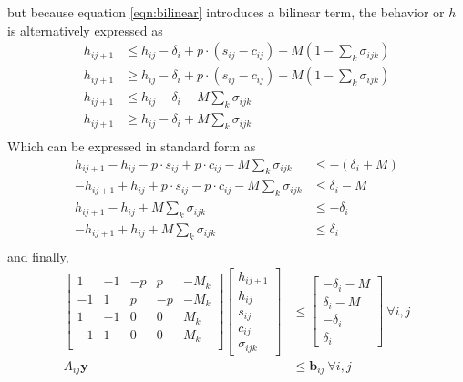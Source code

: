 but because equation \ref{eqn:bilinear} introduces a bilinear term, the behavior or $h$ is alternatively expressed as
\begin{equation} \begin{aligned}
	h_{ij+1} & \le h_{ij} - \delta_i + p\cdot(s_{ij} - c_{ij}) - M(1 - \sum_k\sigma_{ijk})\\
	h_{ij+1} & \ge h_{ij} - \delta_i + p\cdot(s_{ij} - c_{ij}) + M(1 - \sum_k\sigma_{ijk})\\
	h_{ij+1} & \le h_{ij} - \delta_i - M\sum_k\sigma_{ijk}\\
	h_{ij+1} & \ge h_{ij} - \delta_i + M\sum_k\sigma_{ijk}\\
\end{aligned} \end{equation}
Which can be expressed in standard form as
\begin{equation} \begin{aligned}
	 h_{ij+1} - h_{ij} - p\cdot s_{ij} + p\cdot c_{ij} - M\sum_k\sigma_{ijk} &\le -\left(\delta_i + M\right) \\
	-h_{ij+1} + h_{ij} + p\cdot s_{ij} - p\cdot c_{ij} - M\sum_k\sigma_{ijk} &\le \delta_i - M \\
	 h_{ij+1} - h_{ij} + M\sum_k\sigma_{ijk} &\le -\delta_i \\
	-h_{ij+1} + h_{ij} + M\sum_k\sigma_{ijk} & \le \delta_i \\
\end{aligned} \end{equation}
and finally,
\begin{equation} \label{eqn:socDynamic1} \begin{aligned}
	\begin{bmatrix}1  & -1 & -p & p   & -M_k \\
		       -1 & 1  & p  & -p  & -M_k \\
		       1  & -1 & 0             & 0              & M_k  \\
		       -1 & 1  & 0             & 0              & M_k  \\
	\end{bmatrix}
	\begin{bmatrix}h_{ij+1} \\ h_{ij} \\ s_{ij} \\ c_{ij} \\ \sigma_{ijk} \end{bmatrix} &\le 
		\begin{bmatrix}-\delta_i - M \\ \delta_i - M \\ -\delta_i \\ \delta_i \end{bmatrix} \ \forall i,j \\
			A_{ij}\mathbf{y} &\le \mathbf{b}_{ij} \ \forall i,j
\end{aligned} \end{equation}
